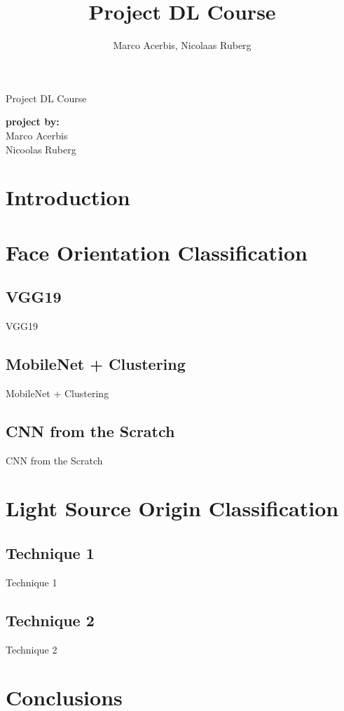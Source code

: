 \documentclass[oneside]{book}
\begin{document}
\begin{titlepage}
\title{Project DL Course}
\author{Marco Acerbis, Nicolaas Ruberg}

\begin{Huge}
\begin{center}
Project DL Course
\end{center}
\end{Huge}

\begin{large}
\begin{minipage}{2in}
\textbf{project by:} \\
Marco Acerbis \\
Nicoolas Ruberg
\end{minipage}
\hfill
\end{large}

\end{titlepage}

\tableofcontents

\chapter*{Introduction}

\chapter{Face Orientation Classification}
\section{VGG19}
VGG19

\section{MobileNet + Clustering}
MobileNet + Clustering

\section{CNN from the Scratch}
CNN from the Scratch

\chapter{Light Source Origin Classification}

\section{Technique 1}
Technique 1

\section{Technique 2}
Technique 2

\chapter{Conclusions}
\end{document}
